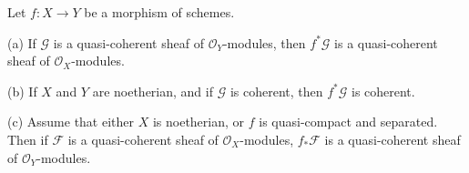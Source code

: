 Let $f: X \rightarrow Y$ be a morphism of schemes.

(a) If $\mathcal{G}$ is a quasi-coherent sheaf of $\mathcal{O}_Y$-modules, then $f^*\mathcal{G}$ is a quasi-coherent sheaf of $\mathcal{O}_X$-modules.

(b) If $X$ and $Y$ are noetherian, and if $\mathcal{G}$ is coherent, then $f^*\mathcal{G}$ is coherent.

(c) Assume that either $X$ is noetherian, or $f$ is quasi-compact and separated. Then if $\mathcal{F}$ is a quasi-coherent sheaf of $\mathcal{O}_X$-modules, $f_*\mathcal{F}$ is a quasi-coherent sheaf of $\mathcal{O}_Y$-modules.
